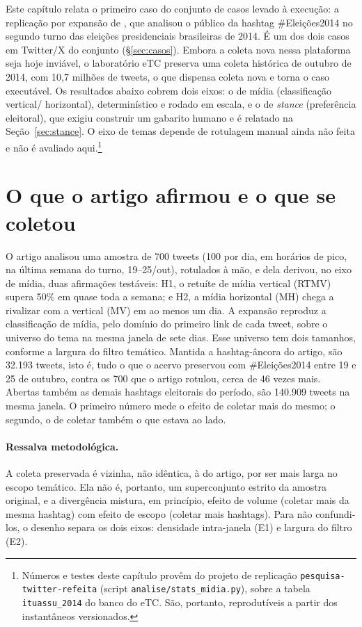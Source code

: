 Este capítulo relata o primeiro caso do conjunto de casos levado à execução: a
replicação por expansão de , que analisou o público
da hashtag \#Eleições2014 no segundo turno das eleições presidenciais
brasileiras de 2014. É um dos dois casos em Twitter/X do conjunto
(\S\ref{sec:casos}). Embora a coleta nova nessa plataforma seja hoje inviável, o laboratório eTC
preserva uma coleta histórica de outubro de 2014, com 10,7 milhões de tweets, o
que dispensa coleta nova e torna o caso executável. Os
resultados abaixo cobrem dois eixos: o de mídia (classificação vertical\slash
horizontal), determinístico e rodado em escala, e o de \emph{stance} (preferência
eleitoral), que exigiu construir um gabarito humano e é relatado na
Seção~\ref{sec:stance}. O eixo de temas depende de rotulagem manual ainda não
feita e não é avaliado aqui.\footnote{Números e testes deste capítulo provêm
do projeto de replicação \texttt{pesquisa-twitter-refeita} (script
\texttt{analise/stats\_midia.py}), sobre a tabela \texttt{ituassu\_2014} do banco
do eTC. São, portanto, reprodutíveis a partir dos instantâneos versionados.}

\section{O que o artigo afirmou e o que se coletou}

O artigo analisou uma amostra de 700 tweets (100 por dia, em
horários de pico, na última semana do turno, 19--25/out), rotulados à mão,
e dela derivou, no eixo de mídia, duas afirmações testáveis: H1, o
retuíte de mídia vertical (RTMV) supera 50\% em quase toda a semana; e
H2, a mídia horizontal (MH) chega a rivalizar com a vertical (MV) em ao
menos um dia. A expansão reproduz a classificação de mídia, pelo domínio do primeiro link de
cada tweet, sobre o universo do tema na mesma janela de sete dias. Esse universo
tem dois tamanhos, conforme a largura do filtro temático. Mantida a hashtag-âncora
do artigo, são 32.193 tweets, isto é, tudo o que o acervo preservou com
\#Eleições2014 entre 19 e 25 de outubro, contra os 700 que o artigo rotulou, cerca
de 46 vezes mais. Abertas também as demais hashtags eleitorais do período, são
140.909 tweets na mesma janela. O primeiro número mede o efeito de coletar mais do
mesmo; o segundo, o de coletar também o que estava ao lado.

\paragraph{Ressalva metodológica.} A coleta preservada é vizinha, não idêntica,
à do artigo, por ser mais larga no escopo temático. Ela não é, portanto, um
superconjunto estrito da amostra original, e a divergência mistura, em princípio,
efeito de volume (coletar mais da mesma hashtag) com efeito de escopo (coletar
mais hashtags). Para não confundi-los, o desenho separa os dois eixos: densidade
intra-janela (E1) e largura do filtro (E2).

